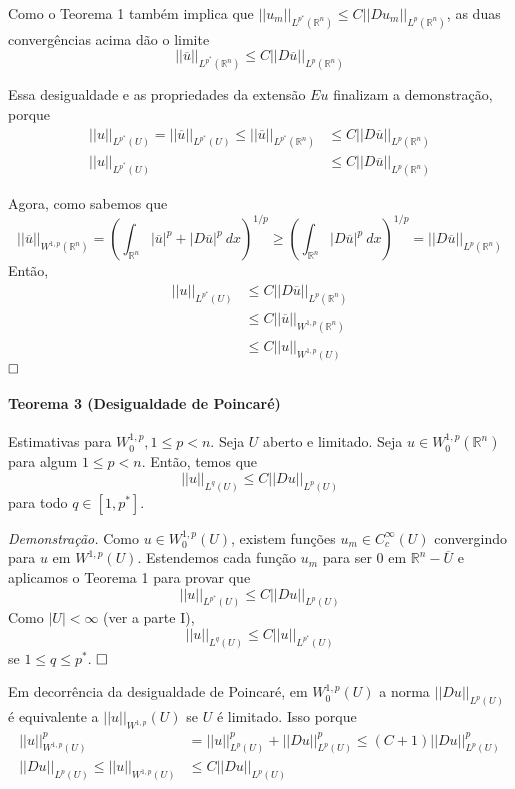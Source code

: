 \documentclass[a4paper, 11pt]{book}
\newcommand{\qed}{$\hfill\square$}
\newcommand{\Rn}{{\mathbb{R}^n}}
\newcommand{\nor}[2]{||#1||_{#2}}
\begin{document}
Como o Teorema 1 também implica que $ ||u_m||_{L^{p^*}(\Rn)} \leq C ||Du_m||_{L^p(\Rn)} $, as duas convergências acima dão o limite \[ ||\overline{u}||_{L^{p^*}(\Rn)} \leq C ||D\overline{u}||_{L^{p}(\Rn)} \]

Essa desigualdade e as propriedades da extensão $Eu$ finalizam a demonstração, porque \begin{align*}
	 ||u||_{L^{p^*}(U)} = ||\overline{u}||_{L^{p^*}(U)} \leq ||\overline{u}||_{L^{p^*}(\Rn)} &\leq  C ||D\overline{u}||_{L^{p}(\Rn)} \\
	  ||u||_{L^{p^*}(U)}  &\leq  C ||D\overline{u}||_{L^{p}(\Rn)}
\end{align*}

Agora, como sabemos que \[ ||\overline{u}||_{W^{1,p}(\Rn)} = \left( \int_\Rn |\overline{u}|^p + |D\overline{u}|^p\ dx \right)^{1/p} \geq \left(\int_\Rn |D\overline{u}|^p\ dx \right)^{1/p} = ||D\overline{u}||_{L^p(\Rn)}\] Então, \begin{align*}
	 ||u||_{L^{p^*}(U)}  &\leq  C ||D\overline{u}||_{L^{p}(\Rn)} \\
	  &\leq  C ||\overline{u}||_{W^{1,p}(\Rn)} \\
	  &\leq   C \nor{u}{W^{1,p}(U)} 
\end{align*}\qed





\paragraph{Teorema 3 (Desigualdade de Poincaré)}\label{t:sobolev-ineq-t3} Estimativas para \( W^{1,p}_0, 1 \leq p < n\). Seja \(U\) aberto e limitado. Seja $u \in W^{1,p}_0(\mathbb{R}^n)$ para algum \(1 \leq p < n\). Então, temos que \[ ||u||_{L^q(U)} \leq C ||Du||_{L^p(U)} \] para todo \( q \in [1, p^*]\). 

\textit{Demonstração.} Como $u \in W^{1,p}_0(U)$, existem funções $u_m \in C^\infty_c(U)$ convergindo para $u$ em $ W^{1,p}(U)$. Estendemos cada função $u_m$ para ser 0 em $\Rn-\overline{U}$ e aplicamos o Teorema 1 para provar que \[ ||u||_{L^{p^*}(U)} \leq C ||Du||_{L^p(U)} \] Como $ |U| < \infty  $ (ver a parte I), \[ ||u||_{L^q(U)} \leq C||u||_{L^{p^*}(U)} \] se $1 \leq q \leq p^*$. \qed

Em decorrência da desigualdade de Poincaré, em $ W^{1,p}_0(U) $ a norma $ ||Du||_{L^p(U)} $ é equivalente a $ ||u||_{W^{1,p}}(U) $ se $U$ é limitado. Isso porque \begin{align*}
	 ||u||_{W^{1,p}(U)}^p &= \nor{u}{L^p(U)}^p + \nor{Du}{L^p(U)}^p \leq (C + 1) \nor{Du}{L^p(U)}^p \\
	 \nor{Du}{L^p(U)} \leq ||u||_{W^{1,p}(U)} &\leq C \nor{Du}{L^p(U)}
\end{align*}
\end{document}
